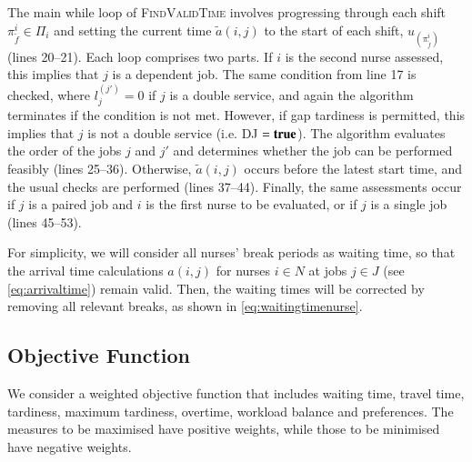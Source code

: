 \documentclass[a4paper,11pt,authoryear]{elsarticle}
\begin{document}
The main while loop of \textsc{FindValidTime} involves progressing through each shift $\pi_{\tilde{f}}^i \in \Pi_i$ and setting the current time $\tilde{a}(i,j)$ to the start of each shift, $u_(\pi_{\tilde{f}}^{i})$ (lines 20--21). Each loop comprises two parts. If $i$ is the second nurse assessed, this implies that $j$ is a dependent job. The same condition from line 17 is checked, where $l_{j}^{(j')} = 0$ if $j$ is a double service, and again the algorithm terminates if the condition is not met. However, if gap tardiness is permitted, this implies that $j$ is not a double service (i.e. DJ $= \textbf{true}$). The algorithm evaluates the order of the jobs $j$ and $j'$ and determines whether the job can be performed feasibly (lines 25--36). Otherwise, $\tilde{a}(i,j)$ occurs before the latest start time, and the usual checks are performed (lines 37--44). Finally, the same assessments occur if $j$ is a paired job and $i$ is the first nurse to be evaluated, or if $j$ is a single job (lines 45--53).

For simplicity, we will consider all nurses' break periods as waiting time, so that the arrival time calculations $a(i,j)$ for nurses $i \in N$ at jobs $j \in J$ (see \eqref{eq:arrivaltime}) remain valid. Then, the waiting times will be corrected by removing all relevant breaks, as shown in \eqref{eq:waitingtimenurse}.





\subsection{Objective Function}
\label{sub:objectivefunc}
\noindent We consider a weighted objective function that includes waiting time, travel time, tardiness, maximum tardiness, overtime, workload balance and preferences. The measures to be maximised have positive weights, while those to be minimised have negative weights.
\end{document}

